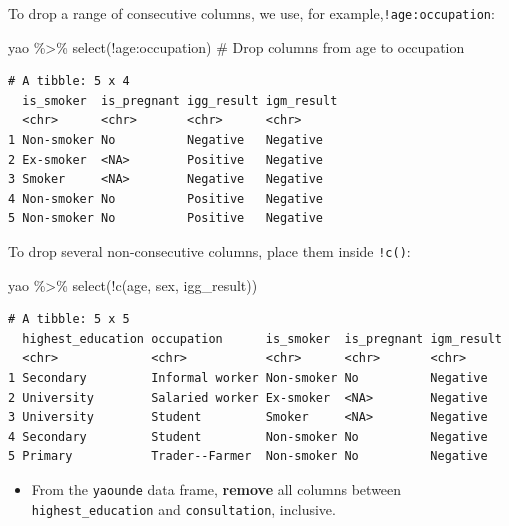 \documentclass[
  letterpaper,
  DIV=11,
  numbers=noendperiod]{scrreprt}
\newenvironment{Shaded}{\begin{snugshade}}{\end{snugshade}}
\newcommand{\CommentTok}[1]{\textcolor[rgb]{0.37,0.37,0.37}{#1}}
\newcommand{\FunctionTok}[1]{\textcolor[rgb]{0.28,0.35,0.67}{#1}}
\newcommand{\NormalTok}[1]{\textcolor[rgb]{0.00,0.23,0.31}{#1}}
\newcommand{\SpecialCharTok}[1]{\textcolor[rgb]{0.37,0.37,0.37}{#1}}
\providecommand{\tightlist}{%
  \setlength{\itemsep}{0pt}\setlength{\parskip}{0pt}}\usepackage{longtable,booktabs,array}
\begin{document}
To drop a range of consecutive columns, we use, for
example,\texttt{!age:occupation}:

\begin{Shaded}
\begin{Highlighting}[]
\NormalTok{yao }\SpecialCharTok{\%\textgreater{}\%} \FunctionTok{select}\NormalTok{(}\SpecialCharTok{!}\NormalTok{age}\SpecialCharTok{:}\NormalTok{occupation) }\CommentTok{\# Drop columns from \textasciigrave{}age\textasciigrave{} to \textasciigrave{}occupation\textasciigrave{}}
\end{Highlighting}
\end{Shaded}

\begin{verbatim}
# A tibble: 5 x 4
  is_smoker  is_pregnant igg_result igm_result
  <chr>      <chr>       <chr>      <chr>     
1 Non-smoker No          Negative   Negative  
2 Ex-smoker  <NA>        Positive   Negative  
3 Smoker     <NA>        Negative   Negative  
4 Non-smoker No          Positive   Negative  
5 Non-smoker No          Positive   Negative  
\end{verbatim}

To drop several non-consecutive columns, place them inside
\texttt{!c()}:

\begin{Shaded}
\begin{Highlighting}[]
\NormalTok{yao }\SpecialCharTok{\%\textgreater{}\%} \FunctionTok{select}\NormalTok{(}\SpecialCharTok{!}\FunctionTok{c}\NormalTok{(age, sex, igg\_result))}
\end{Highlighting}
\end{Shaded}

\begin{verbatim}
# A tibble: 5 x 5
  highest_education occupation      is_smoker  is_pregnant igm_result
  <chr>             <chr>           <chr>      <chr>       <chr>     
1 Secondary         Informal worker Non-smoker No          Negative  
2 University        Salaried worker Ex-smoker  <NA>        Negative  
3 University        Student         Smoker     <NA>        Negative  
4 Secondary         Student         Non-smoker No          Negative  
5 Primary           Trader--Farmer  Non-smoker No          Negative  
\end{verbatim}

\begin{tcolorbox}[enhanced jigsaw, colframe=quarto-callout-tip-color-frame, rightrule=.15mm, opacityback=0, breakable, coltitle=black, colbacktitle=quarto-callout-tip-color!10!white, bottomrule=.15mm, leftrule=.75mm, toprule=.15mm, arc=.35mm, bottomtitle=1mm, colback=white, left=2mm, opacitybacktitle=0.6, titlerule=0mm, title=\textcolor{quarto-callout-tip-color}{\faLightbulb}\hspace{0.5em}{Practice}, toptitle=1mm]

\begin{itemize}
\tightlist
\item
  From the \texttt{yaounde} data frame, \textbf{remove} all columns
  between \texttt{highest\_education} and \texttt{consultation},
  inclusive.
\end{itemize}

\end{tcolorbox}
\end{document}
